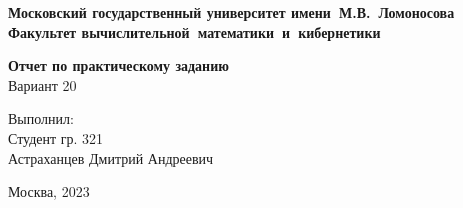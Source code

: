 \begin{titlepage}


\begin{center}
\large{\textbf{Московский государственный университет имени~М.В.~Ломоносова}}\\
\hfill \break
\large{\textbf{Факультет вычислительной~математики~и~кибернетики}}\\
\vspace{6cm}

{\bf\LARGE Отчет по практическому заданию}\\
\vspace{1cm}
Вариант 20


\end{center}
\vspace{3cm}
\begin{flushright}

Выполнил:\\
Студент гр. 321\\
Астраханцев Дмитрий Андреевич\\

\end{flushright}

\vfill
\centerline {\large{Москва, 2023}}

\end{titlepage}
\newpage


